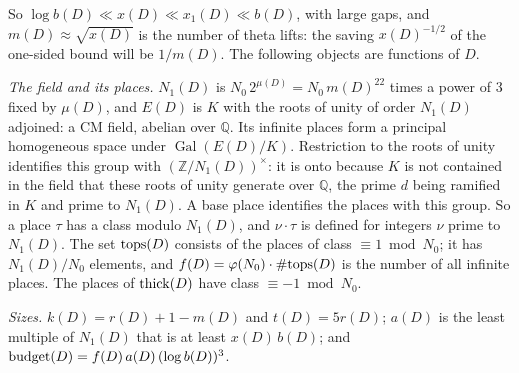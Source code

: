So $\log b(D)\ll x(D)\ll x_1(D)\ll b(D)$, with large gaps, and $m(D)\approx\sqrt{x(D)}$ is the number of theta lifts: the saving
$x(D)^{-1/2}$ of the one-sided bound will be $1/m(D)$. The following objects are functions of $D$.

\emph{The field and its places.} $N_1(D)$ is $N_0\,2^{\mu(D)}=N_0\,m(D)^{22}$ times a power of $3$ fixed by $\mu(D)$, and $E(D)$ is $K$
with the roots of unity of order $N_1(D)$ adjoined: a CM field, abelian over $\mathbb{Q}$. Its infinite places
form a principal homogeneous space under $\operatorname{Gal}(E(D)/K)$. Restriction to the roots of unity identifies
this group with $(\mathbb{Z}/N_1(D))^\times$: it is onto because $K$ is not contained in the field that these roots
of unity generate over $\mathbb{Q}$, the prime $d$ being ramified in $K$ and prime to $N_1(D)$. A base place
identifies the places with this group. So a place $\tau$ has a class modulo $N_1(D)$, and $\nu\cdot\tau$ is defined for
integers $\nu$ prime to $N_1(D)$. The set $\mathrm{tops}(D)$ consists of the places of class $\equiv1\bmod N_0$; it has
$N_1(D)/N_0$ elements, and $f(D)=\varphi(N_0)\cdot\#\mathrm{tops}(D)$ is the number of all infinite places. The places of
$\mathrm{thick}(D)$ have class $\equiv-1\bmod N_0$.

\emph{Sizes.} $k(D)=r(D)+1-m(D)$ and $t(D)=5r(D)$; $a(D)$ is the least multiple of $N_1(D)$ that is at least $x(D)\,b(D)$; and
$\mathrm{budget}(D)=f(D)\,a(D)\,(\log b(D))^3$.

